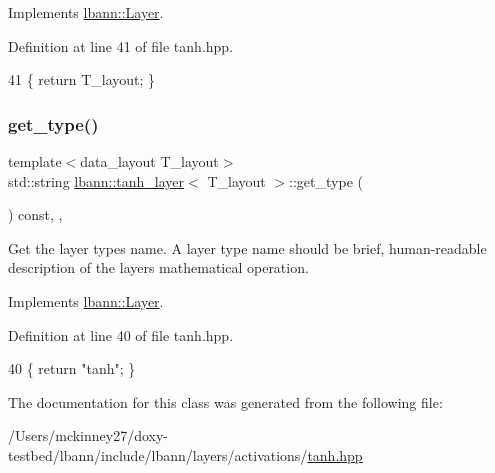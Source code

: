 Implements \hyperlink{classlbann_1_1Layer_a5dfb66e81fc085997402a5e2241316bd}{lbann\+::\+Layer}.



Definition at line 41 of file tanh.\+hpp.


\begin{DoxyCode}
41 \{ \textcolor{keywordflow}{return} T\_layout; \}
\end{DoxyCode}
\mbox{\label{classlbann_1_1tanh__layer_a756fe7a6c9f9f7d3a43f2a507a76b6d8}} 
\subsubsection{\texorpdfstring{get\+\_\+type()}{get\_type()}}
{\footnotesize\ttfamily template$<$data\+\_\+layout T\+\_\+layout$>$ \\
std\+::string \hyperlink{classlbann_1_1tanh__layer}{lbann\+::tanh\+\_\+layer}$<$ T\+\_\+layout $>$\+::get\+\_\+type (\begin{DoxyParamCaption}{ }\end{DoxyParamCaption}) const\hspace{0.3cm}{\ttfamily [inline]}, {\ttfamily [override]}, {\ttfamily [virtual]}}

Get the layer type\textquotesingle{}s name. A layer type name should be brief, human-\/readable description of the layer\textquotesingle{}s mathematical operation. 

Implements \hyperlink{classlbann_1_1Layer_a0fa0ea9160b490c151c0a17fde4f7239}{lbann\+::\+Layer}.



Definition at line 40 of file tanh.\+hpp.


\begin{DoxyCode}
40 \{ \textcolor{keywordflow}{return} \textcolor{stringliteral}{"tanh"}; \}
\end{DoxyCode}


The documentation for this class was generated from the following file\+:\begin{DoxyCompactItemize}
\item 
/\+Users/mckinney27/doxy-\/testbed/lbann/include/lbann/layers/activations/\hyperlink{tanh_8hpp}{tanh.\+hpp}\end{DoxyCompactItemize}
